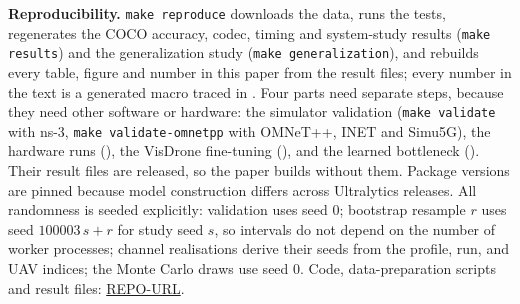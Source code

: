 \documentclass[journal,twocolumn,10pt]{IEEEtran}
\begin{document}
\textbf{Reproducibility.} \texttt{make reproduce} downloads the data, runs the tests, regenerates the COCO accuracy, codec, timing and system-study results (\texttt{make results}) and the generalization study (\texttt{make generalization}), and rebuilds every table, figure and number in this paper from the result files; every number in the text is a generated macro traced in . Four parts need separate steps, because they need other software or hardware: the simulator validation (\texttt{make validate} with ns-3, \texttt{make validate-omnetpp} with OMNeT++, INET and Simu5G), the hardware runs (), the VisDrone fine-tuning (), and the learned bottleneck (). Their result files are released, so the paper builds without them. Package versions are pinned because model construction differs across Ultralytics releases. All randomness is seeded explicitly: validation uses seed 0; bootstrap resample $r$ uses seed $100003\,s+r$ for study seed $s$, so intervals do not depend on the number of worker processes; channel realisations derive their seeds from the profile, run, and UAV indices; the Monte Carlo draws use seed 0. Code, data-preparation scripts and result files: \url{REPO-URL}. %
\end{document}
